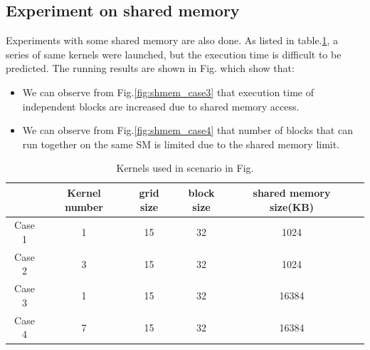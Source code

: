 \documentclass[12pt,journal,compsoc]{IEEEtran}
\begin{document}
\subsection{Experiment on shared memory}
Experiments with some shared memory are also done. As listed in table.\ref{table:shmem_kernel}, a series of same kernels were launched, but the execution time is difficult to be predicted. The running results are shown in Fig. which show that:
\begin{itemize}
   \item We can observe from Fig.\ref{fig:shmem_case3} that execution time of independent blocks are increased due to shared memory access. 
   \item We can observe from Fig.\ref{fig:shmem_case4} that number of blocks that can run together on the same SM is limited due to the shared memory limit.
\end{itemize}

\begin{table}[ht]
   \caption{Kernels used in scenario in Fig. }
   \centering
   \begin{tabular}{|c|c|c|c|c|c|}
   \hline
    & \bf Kernel number & \bf grid size & \bf block size & \bf shared memory size(KB) \\
    \hline
   Case 1 & 1 & 15 & 32 & 1024   \\
   Case 2 & 3 & 15 & 32 & 1024  \\ 
   Case 3 & 1 & 15 & 32 & 16384  \\
   Case 4 & 7 & 15 & 32 & 16384  \\
   \hline
   \end{tabular}
   \label{table:shmem_kernel}
\end{table}
\end{document}
